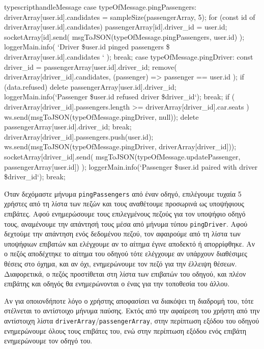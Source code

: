 \documentclass[../thesis.tex]{subfiles}
\begin{document}
\begin{codeblock}{typescript}{handleMessage}
  case typeOfMessage.pingPassengers: {
    driverArray[user.id].candidates = sampleSize(passengerArray, 5);
    for (const id of driverArray[user.id].candidates) {
      passengerArray[id].driver_id = user.id;
      socketArray[id].send(
        msgToJSON(typeOfMessage.pingPassengers, user.id)
      );
    }
    loggerMain.info(
      `Driver \${user.id} pinged passengers \${
        driverArray[user.id].candidates
      }`
    );
    break;
  }
  case typeOfMessage.pingDriver: {
    const driver_id = passengerArray[user.id].driver_id;
    remove(
      driverArray[driver_id].candidates,
      (passenger) => passenger == user.id
    );
    if (data.refused) {
      delete passengerArray[user.id].driver_id;
      loggerMain.info(`Passenger \${user.id} refused driver \${driver_id}`);
      break;
    }
    if (
      driverArray[driver_id].passengers.length >=
      driverArray[driver_id].car.seats
    ) {
      ws.send(msgToJSON(typeOfMessage.pingDriver, null));
      delete passengerArray[user.id].driver_id;
      break;
    }
    driverArray[driver_id].passengers.push(user.id);
    ws.send(msgToJSON(typeOfMessage.pingDriver, driverArray[driver_id]));
    socketArray[driver_id].send(
      msgToJSON(typeOfMessage.updatePassenger, passengerArray[user.id])
    );
    loggerMain.info(`Passenger \${user.id} paired with driver \${driver_id}`);
    break;
  }
\end{codeblock}

Όταν δεχόμαστε μήνυμα \texttt{pingPassengers} από έναν οδηγό, επιλέγουμε τυχαία 5 χρήστες από τη λίστα των πεζών και τους αναθέτουμε προσωρινά ως υποψήφιους επιβάτες.
Αφού ενημερώσουμε τους επιλεγμένους πεζούς για τον υποψήφιο οδηγό τους, αναμένουμε την απάντησή τους μέσα από μήνυμα τύπου \texttt{pingDriver}.
Αφού δεχτούμε την απάντηση ενός δεδομένου πεζού, τον αφαιρούμε από τη λίστα των υποψήφιων επιβατών και ελέγχουμε αν το αίτημα έγινε αποδεκτό ή απορρίφθηκε.
Αν ο πεζός αποδέχτηκε το αίτημα του οδηγού τότε ελέγχουμε αν υπάρχουν διαθέσιμες θέσεις στο όχημα, και αν όχι, ενημερώνουμε τον πεζό για την έλλειψη θέσεων.
Διαφορετικά, ο πεζός προστίθεται στη λίστα των επιβατών του οδηγού, και πλέον επιβάτης και οδηγός θα ενημερώνονται ο ένας για την τοποθεσία του άλλου.

Αν για οποιονδήποτε λόγο ο χρήστης αποφασίσει να διακόψει τη διαδρομή του, τότε στέλνεται το αντίστοιχο μήνυμα παύσης.
Εκτός από την αφαίρεση του χρήστη από την αντίστοιχη λίστα \texttt{driverArray}/\texttt{passengerArray}, στην περίπτωση εξόδου του οδηγού ενημερώνουμε όλους τους επιβάτες του, ενώ στην περίπτωση εξόδου ενός επιβάτη ενημερώνουμε τον οδηγό του.
\end{document}

